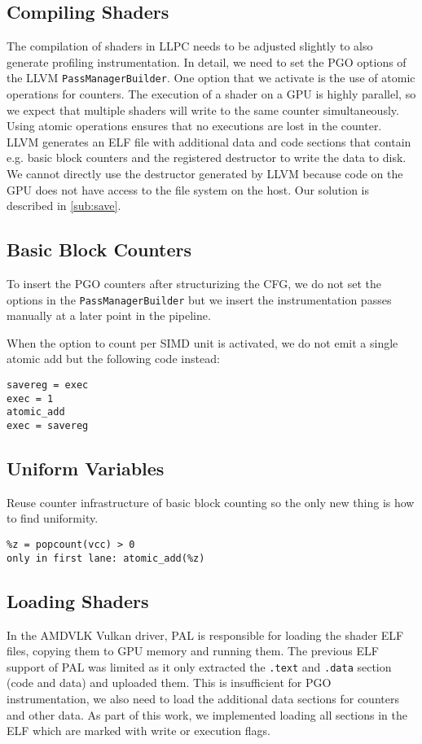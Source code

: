 \subsection{Compiling Shaders}
\label{sub:compiling}
The compilation of shaders in LLPC needs to be adjusted slightly to also generate profiling instrumentation. In detail, we need to set the PGO options of the LLVM \texttt{PassManagerBuilder}. One option that we activate is the use of atomic operations for counters. The execution of a shader on a GPU is highly parallel, so we expect that multiple shaders will write to the same counter simultaneously. Using atomic operations ensures that no executions are lost in the counter. LLVM generates an ELF file with additional data and code sections that contain e.g. basic block counters and the registered destructor to write the data to disk. We cannot directly use the destructor generated by LLVM because code on the GPU does not have access to the file system on the host. Our solution is described in \cref{sub:save}.

\subsection{Basic Block Counters}
\label{sub:bbcounters}
To insert the PGO counters after structurizing the CFG, we do not set the options in the \texttt{PassManagerBuilder} but we insert the instrumentation passes manually at a later point in the pipeline.

When the option to count per SIMD unit is activated, we do not emit a single atomic add but the following code instead:
\begin{lstlisting}[caption={Counting per SIMD unit},language={[x86masm]Assembler}]
savereg = exec
exec = 1
atomic_add
exec = savereg
\end{lstlisting}

\subsection{Uniform Variables}
\label{sub:impl_uniformity}
Reuse counter infrastructure of basic block counting so the only new thing is how to find uniformity.
\begin{lstlisting}[caption={Check a variable for uniformity},language={[x86masm]Assembler}]
%y = %x == read_first_lane
%z = popcount(vcc) > 0
only in first lane: atomic_add(%z)
\end{lstlisting}

\subsection{Loading Shaders}
\label{sub:loading}
In the AMDVLK Vulkan driver, PAL is responsible for loading the shader ELF files, copying them to GPU memory and running them. The previous ELF support of PAL was limited as it only extracted the \texttt{.text} and \texttt{.data} section (code and data) and uploaded them. This is insufficient for PGO instrumentation, we also need to load the additional data sections for counters and other data. As part of this work, we implemented loading all sections in the ELF which are marked with write or execution flags.

